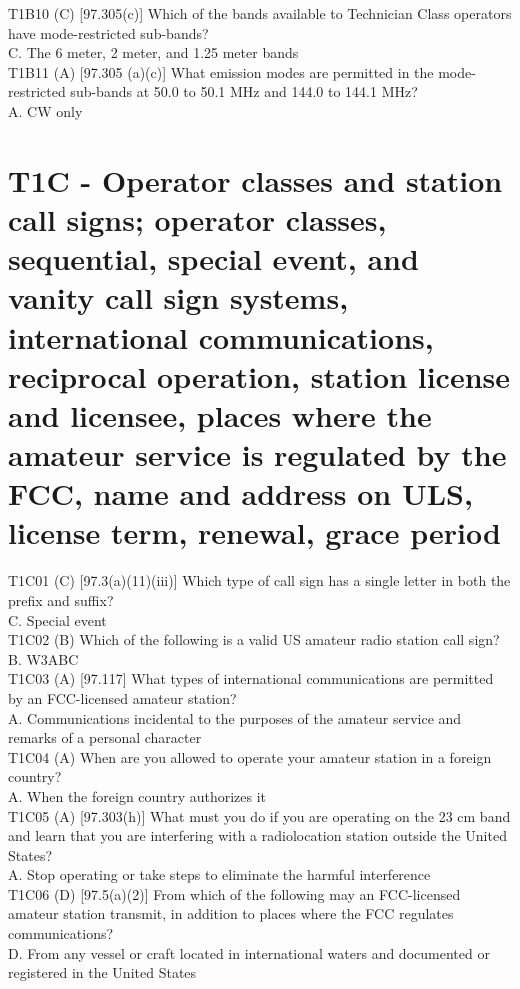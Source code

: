 \documentclass[12pt,letterpaper]{report}
\begin{document}
T1B10 (C) [97.305(c)] Which of the bands available to Technician Class operators have mode-restricted sub-bands?\\
C. The 6 meter, 2 meter, and 1.25 meter bands\\

T1B11 (A) [97.305 (a)(c)] What emission modes are permitted in the mode-restricted sub-bands at 50.0 to 50.1 MHz and 144.0 to 144.1 MHz?\\
A. CW only\\

\section{T1C - Operator classes and station call signs; operator classes, sequential, special event, and vanity call sign systems, international communications, reciprocal operation, station license and licensee, places where the amateur service is regulated by the FCC, name and address on ULS, license term, renewal, grace period}

T1C01 (C) [97.3(a)(11)(iii)] Which type of call sign has a single letter in both the prefix and suffix?\\
C. Special event\\

T1C02 (B) Which of the following is a valid US amateur radio station call sign?\\
B. W3ABC\\

T1C03 (A) [97.117] What types of international communications are permitted by an FCC-licensed amateur station?\\
A. Communications incidental to the purposes of the amateur service and remarks of a personal character\\

T1C04 (A) When are you allowed to operate your amateur station in a foreign country?\\
A. When the foreign country authorizes it\\

T1C05 (A) [97.303(h)] What must you do if you are operating on the 23 cm band and learn that you are interfering with a radiolocation station outside the United States?\\
A. Stop operating or take steps to eliminate the harmful interference\\

T1C06 (D) [97.5(a)(2)] From which of the following may an FCC-licensed amateur station transmit, in addition to places where the FCC regulates communications?\\
D. From any vessel or craft located in international waters and documented or registered in the United States\\
\end{document}
